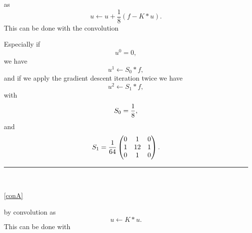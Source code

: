 \begin{enumerate}
as
 \begin{equation}
u \leftarrow u + \frac{1}{8}( f - K\ast u).
\end{equation}
This can be done with  the convolution



Especially if 
$$
u^{0} = 0,
$$
we have
\begin{equation}
u^{1} \leftarrow S_0 \ast f,
\end{equation}
and if we apply the gradient descent iteration twice we have 
\begin{equation}
u^{2} \leftarrow S_1 \ast f,
\end{equation}
with 
\begin{equation}\label{eq:kernel-S}
S_0 = {1 \over 8},
\end{equation}
and 
\begin{equation}\label{eq:kernel-S2}
S_1={1\over 64} \begin{pmatrix}
0 & 1 & 0 \\
1 & 12 & 1  \\
0 &1  & 0
\end{pmatrix}.
\end{equation}
\hrule

%
%
%

\

\eqref{conA}

 by convolution as
\begin{equation}
u \leftarrow K\ast u.
\end{equation}
This can be done with




\

%
%


\end{enumerate}

